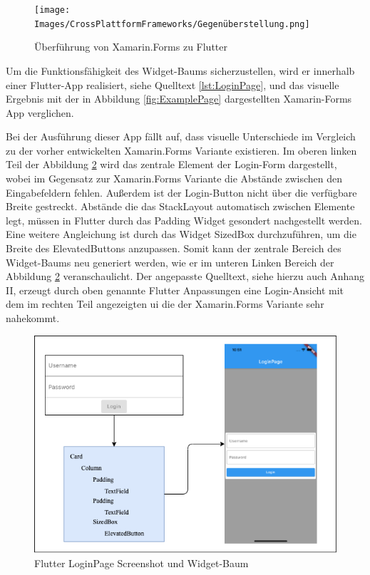 \begin{figure}[!ht]
 \texttt{[image: Images/CrossPlattformFrameworks/Gegenüberstellung.png]}
 \caption{Überführung von Xamarin.Forms zu Flutter}
 \label{fig:LayoutTrees}
\end{figure}

Um die Funktionsfähigkeit des Widget-Baums sicherzustellen,  wird er innerhalb einer Flutter-App realisiert, siehe Quelltext \ref{lst:LoginPage}, und das visuelle Ergebnis mit der in Abbildung \ref{fig:ExamplePage} dargestellten Xamarin-Forms App verglichen. 

 

Bei der Ausführung dieser App fällt auf,  dass visuelle Unterschiede im Vergleich zu der vorher entwickelten Xamarin.Forms Variante existieren.  Im oberen linken Teil der Abbildung \ref{fig:LoginPageFlutter} wird das zentrale Element der Login-Form dargestellt, wobei im Gegensatz zur Xamarin.Forms Variante die Abstände zwischen den Eingabefeldern fehlen.  Außerdem ist der Login-Button nicht über die verfügbare Breite gestreckt.  Abstände die das \glq StackLayout\grq{} automatisch zwischen Elemente legt,  müssen in Flutter durch das \glq Padding\grq{} Widget gesondert nachgestellt werden.  Eine weitere Angleichung ist durch das Widget \glq SizedBox\grq{} durchzuführen,  um die Breite des \glq ElevatedButtons\grq{} anzupassen.  Somit kann der zentrale Bereich des Widget-Baums neu generiert werden,  wie er im unteren Linken Bereich der Abbildung \ref{fig:LoginPageFlutter} veranschaulicht.  Der angepasste Quelltext,  siehe hierzu auch Anhang II,  erzeugt durch oben genannte Flutter Anpassungen eine Login-Ansicht mit dem im rechten Teil angezeigten \ac{ui} die der Xamarin.Forms Variante sehr nahekommt.

\begin{figure}[!ht]
 \includegraphics[width=\textwidth,height=\textheight,keepaspectratio]{Images/CrossPlattformFrameworks/FlutterLoginPage.png}
 \caption{Flutter LoginPage Screenshot und Widget-Baum}
 \label{fig:LoginPageFlutter}
\end{figure}

